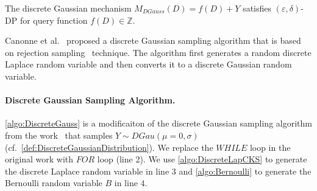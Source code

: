 \begin{theorem}
    The discrete Gaussian mechanism $M_{DGauss}\left(D\right)=f\left(D\right)+Y$ satisfies $\left(\varepsilon,\delta\right) $-DP for query function $f\left(D\right)\in\mathbb{Z} $.
\end{theorem}

Canonne et al.~\cite{canonne2020discrete} proposed a discrete Gaussian sampling algorithm that is based on rejection sampling~\cite{casella2004generalized} technique. The algorithm first generates a random discrete Laplace random variable and then converts it to a discrete Gaussian random variable.



\paragraph{Discrete Gaussian Sampling Algorithm.}
\label{para:DiscreteGaussianSamplingAlgorithm}
\autoref{algo:DiscreteGauss} is a modificaiton of the discrete Gaussian sampling algorithm from the work~\cite{canonne2020discrete} that samples $Y\sim DGau\left( \mu=0,\sigma\right)$ (cf.~\autoref{def:DiscreteGaussianDistribution}).
We replace the $WHILE$ loop in the original work with $FOR$ loop (line 2).
We use \autoref{algo:DiscreteLapCKS} to generate the discrete Laplace random variable in line $3$ and \autoref{algo:Bernoulli} to generate the Bernoulli random variable $B$ in line $4$.


